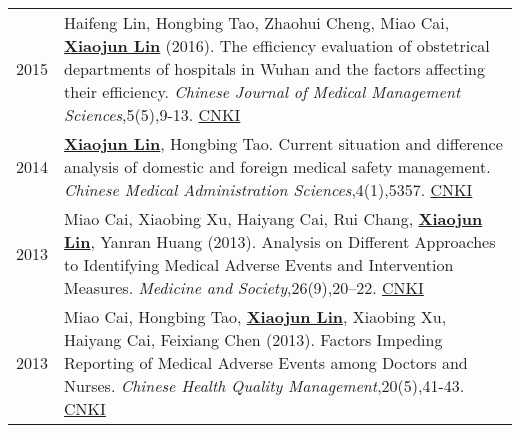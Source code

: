 \documentclass[a4paper,10pt]{article}
\begin{document}
\begin{longtable}{r p{13cm}}
2015 & Haifeng Lin, Hongbing Tao, Zhaohui Cheng, Miao Cai, \underline{\textbf{Xiaojun Lin}} (2016). The efficiency evaluation of obstetrical departments of hospitals in Wuhan and the factors affecting their efficiency. \emph{Chinese Journal of Medical Management Sciences},5(5),9-13. \href{http://kns.cnki.net/KCMS/detail/detail.aspx?dbcode=CJFQ&dbname=CJFDLAST2015&filename=YLGL201505004&v=MjkxODIxTHV4WVM3RGgxVDNxVHJXTTFGckNVUkxLZVp1WnNGaXZtVkx2QVBDSE1Zckc0SDlUTXFvOUZZSVI4ZVg=}{CNKI}\\[5pt]

2014 & \underline{\textbf{Xiaojun Lin}}, Hongbing Tao. Current situation and difference analysis of domestic and foreign medical safety management. \emph{Chinese Medical Administration Sciences},4(1),5357. \href{http://kns.cnki.net/KCMS/detail/detail.aspx?dbcode=CJFQ&dbname=CJFD2014&filename=YLGL201401019&v=MjQzMzVUcldNMUZyQ1VSTEtlWnVadEZpRG5WNy9JUENITVlyRzRIOVhNcm85RWJZUjhlWDFMdXhZUzdEaDFUM3E=}{CNKI}\\[5pt]

2013 & Miao Cai, Xiaobing Xu, Haiyang Cai, Rui Chang, \underline{\textbf{Xiaojun Lin}}, Yanran Huang (2013). Analysis on Different Approaches to Identifying Medical Adverse Events and Intervention Measures. \emph{Medicine and Society},26(9),20–22. \href{http://kns.cnki.net/KCMS/detail/detail.aspx?dbcode=CJFQ&dbname=CJFDHIS2&filename=YXSH201309007&v=MDAwNDFyQ1VSTEtlWnVac0Zpdm1XcnZOUERYWVpyRzRIOUxNcG85Rlk0UjhlWDFMdXhZUzdEaDFUM3FUcldNMUY=}{CNKI}\\[5pt]

2013 & Miao Cai, Hongbing Tao, \underline{\textbf{Xiaojun Lin}}, Xiaobing Xu, Haiyang Cai, Feixiang Chen (2013). Factors Impeding Reporting of Medical Adverse Events among Doctors and Nurses. \emph{Chinese Health Quality Management},20(5),41-43. \href{http://kns.cnki.net/KCMS/detail/detail.aspx?dbcode=CJFQ&dbname=CJFDHIS2&filename=WSJG201305024&v=Mjc4MDIxTHV4WVM3RGgxVDNxVHJXTTFGckNVUkxLZVp1WnNGaXZuVXJ6Tk1qN0JhYkc0SDlMTXFvOUhZSVI4ZVg=}{CNKI}\\[5pt]
\end{longtable}
\end{document}
